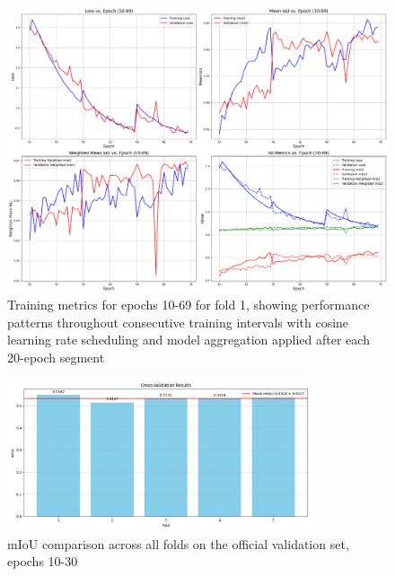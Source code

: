\documentclass[]{article}
\begin{document}
\begin{figure}[htbp]
		\centering
		\includegraphics[width=1.0\textwidth]{../outputs/deeplabv3plus_test_results/early_training_epochs_10_to_69.png}
		\caption{Training metrics for epochs 10-69 for fold 1, showing performance patterns throughout consecutive training intervals with cosine learning rate scheduling and model aggregation applied after each 20-epoch segment}
		\label{fig:train_metrics_10_69}
\end{figure}

\begin{figure}[htbp]
    \centering
    \includegraphics[width=0.8\textwidth]{figures/folds_10_30.png}
    \caption{mIoU comparison across all folds on the official validation set, epochs 10-30}
    \label{fig:cross_val_10_30_val}
\end{figure}
\end{document}

